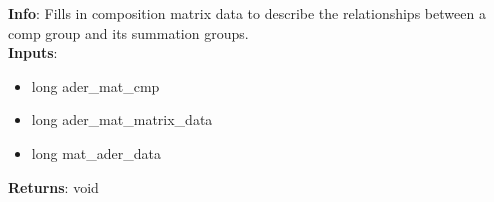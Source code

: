 \textbf{Info}: Fills in composition matrix data to describe the relationships
between a comp group and its summation groups. \\

\noindent \textbf{Inputs}:
\begin{itemize}
\item{long ader\_mat\_cmp}
\item{long ader\_mat\_matrix\_data}
\item{long mat\_ader\_data}
\end{itemize}

\noindent \textbf{Returns}: void
